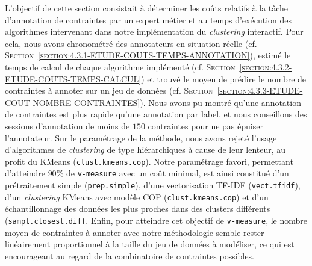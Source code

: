 			L'objectif de cette section consistait à déterminer les coûts relatifs à la tâche d'annotation de contraintes par un expert métier et au temps d'exécution des algorithmes intervenant dans notre implémentation du \textit{clustering} interactif.
			Pour cela, nous avons chronométré des annotateurs en situation réelle (cf. \textsc{Section~\ref{section:4.3.1-ETUDE-COUTS-TEMPS-ANNOTATION}}), estimé le temps de calcul de chaque algorithme implémenté (cf. \textsc{Section~\ref{section:4.3.2-ETUDE-COUTS-TEMPS-CALCUL}}) et trouvé le moyen de prédire le nombre de contraintes à annoter sur un jeu de données (cf. \textsc{Section~\ref{section:4.3.3-ETUDE-COUT-NOMBRE-CONTRAINTES}}).
			Nous avons pu montré qu'une annotation de contraintes est plus rapide qu'une annotation par label, et nous conseillons des sessions d'annotation de moins de $150$ contraintes pour ne pas épuiser l'annotateur.
			Sur le paramétrage de la méthode, nous avons rejeté l'usage d'algorithmes de \textit{clustering} de type hiérarchiques à cause de leur lenteur, au profit du KMeans (\texttt{clust.kmeans.cop}).
			Notre paramétrage favori, permettant d'atteindre $90$\% de \texttt{v-measure} avec un coût minimal, est ainsi constitué d'un prétraitement simple (\texttt{prep.simple}), d'une vectorisation TF-IDF (\texttt{vect.tfidf}), d'un \textit{clustering} KMeans avec modèle COP (\texttt{clust.kmeans.cop}) et d'un échantillonnage des données les plus proches dans des clusters différents (\texttt{sampl.closest.diff}.
			Enfin, pour atteindre cet objectif de \texttt{v-measure}, le nombre moyen de contraintes à annoter avec notre méthodologie semble rester linéairement proportionnel à la taille du jeu de données à modéliser, ce qui est encourageant au regard de la combinatoire de contraintes possibles.
			\\
			
